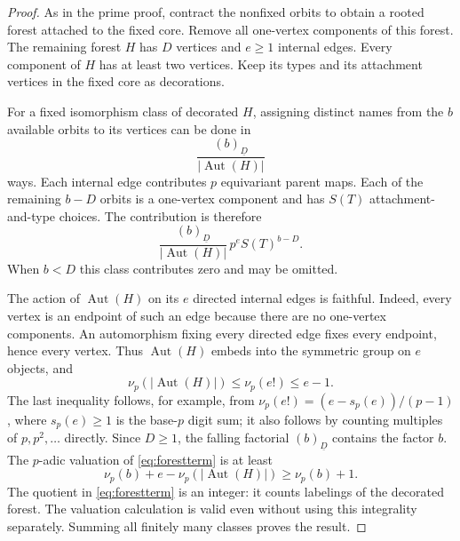 \documentclass[11pt,letterpaper]{article}
\theoremstyle{definition}
\theoremstyle{remark}
\newcommand{\Aut}{\operatorname{Aut}}
\newcommand{\fall}[2]{(#1)_{\underline{#2}}}
\begin{document}
\begin{proof}
As in the prime proof, contract the nonfixed orbits to obtain a rooted
forest attached to the fixed core. Remove all one-vertex components of
this forest. The remaining forest $H$ has $D$ vertices and $e\ge1$
internal edges. Every component of $H$ has at least two vertices. Keep
its types and its attachment vertices in the fixed core as decorations.

For a fixed isomorphism class of decorated $H$, assigning distinct names
from the $b$ available orbits to its vertices can be done in
\[
 \frac{\fall bD}{|\Aut(H)|}
\]
ways. Each internal edge contributes $p$ equivariant parent maps. Each
of the remaining $b-D$ orbits is a one-vertex component and has $S(T)$
attachment-and-type choices. The contribution is therefore
\begin{equation}\label{eq:forestterm}
 \frac{\fall bD}{|\Aut(H)|}\,p^e S(T)^{b-D}.
\end{equation}
When $b<D$ this class contributes zero and may be omitted.

The action of $\Aut(H)$ on its $e$ directed internal edges is faithful.
Indeed, every vertex is an endpoint of such an edge because there are
no one-vertex components. An automorphism fixing every directed edge
fixes every endpoint, hence every vertex. Thus $\Aut(H)$ embeds into the
symmetric group on $e$ objects, and
\[
 \nu_p(|\Aut(H)|)\le\nu_p(e!)\le e-1.
\]
The last inequality follows, for example, from
$\nu_p(e!)=(e-s_p(e))/(p-1)$, where $s_p(e)\ge1$ is the base-$p$ digit
sum; it also follows by counting multiples of $p,p^2,\ldots$ directly.
Since $D\ge1$, the falling factorial $\fall bD$ contains the factor $b$.
The $p$-adic valuation of \eqref{eq:forestterm} is at least
\[
 \nu_p(b)+e-\nu_p(|\Aut(H)|)\ge\nu_p(b)+1.
\]
The quotient in \eqref{eq:forestterm} is an integer: it counts labelings
of the decorated forest. The valuation calculation is valid even
without using this integrality separately. Summing all finitely many
classes proves the result.
\end{proof}
\end{document}
